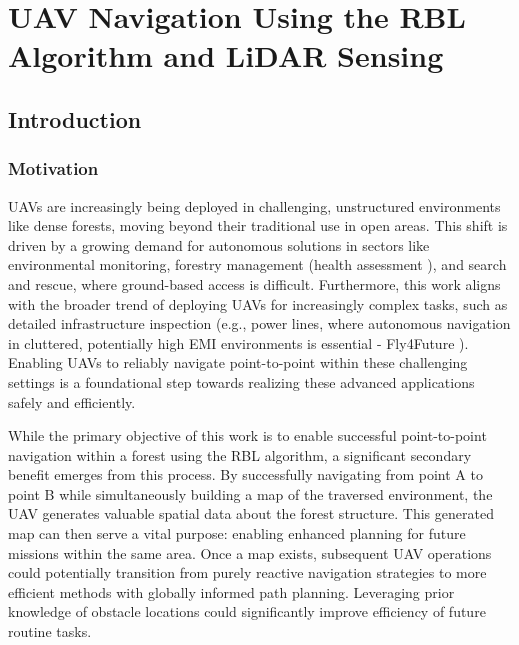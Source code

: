 \chapter{UAV Navigation Using the RBL Algorithm and LiDAR Sensing\label{chap:lidar}}

    \section{Introduction}
        \subsection{Motivation}
        \ac{UAV}s are increasingly being deployed in challenging, unstructured environments like dense forests, moving beyond their traditional use in open areas.
        This shift is driven by a growing demand for autonomous solutions in sectors like environmental monitoring, forestry management (health assessment \cite{kurovec_fel_clanek}), and search and rescue, where ground-based access is difficult. 
        Furthermore, this work aligns with the broader trend of deploying \ac{UAV}s for increasingly complex tasks, such as detailed infrastructure inspection (e.g., power lines, where autonomous navigation in cluttered, potentially high \ac{EMI} environments is essential - Fly4Future \cite{f4f_powerline_inspection}). 
        Enabling \ac{UAV}s to reliably navigate point-to-point within these challenging settings is a foundational step towards realizing these advanced applications safely and efficiently.

        While the primary objective of this work is to enable successful point-to-point navigation within a forest using the \ac{RBL} algorithm, a significant secondary benefit emerges from this process. 
        By successfully navigating from point A to point B while simultaneously building a map of the traversed environment, the \ac{UAV} generates valuable spatial data about the forest structure. 
        This generated map can then serve a vital purpose: enabling enhanced planning for future missions within the same area. 
        Once a map exists, subsequent \ac{UAV} operations could potentially transition from purely reactive navigation strategies to more efficient methods with globally informed path planning. 
        Leveraging prior knowledge of obstacle locations could significantly improve efficiency of future routine tasks.
        
